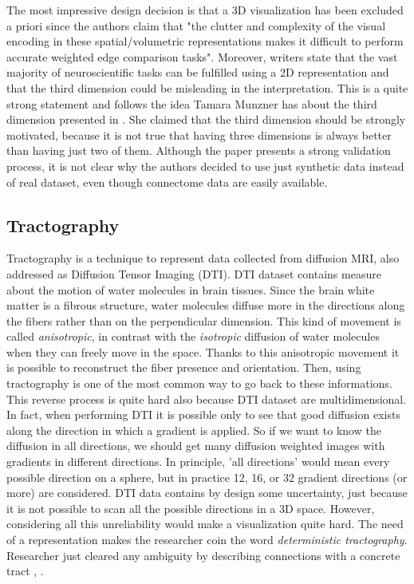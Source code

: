 \documentclass{article}
\begin{document}
\begin{multicols}{2}
The most impressive design decision is that a 3D visualization has been excluded a priori since the authors claim that "the clutter and complexity of the visual encoding in these spatial/volumetric representations makes it difficult to perform accurate weighted edge comparison tasks". Moreover, writers state that the vast majority of neuroscientific tasks can be fulfilled using a 2D representation and that the third dimension could be misleading in the interpretation. This is a quite strong statement and follows the idea Tamara Munzner has about the third dimension presented in \cite{processAndPitfalls}. She claimed that the third dimension should be strongly motivated, because it is not true that having three dimensions is always better than having just two of them. Although the paper presents a strong validation process, it is not clear why the authors decided to use just synthetic data instead of real dataset, even though connectome data are easily available.

\subsection{Tractography}
\label{subsec:tractography}
Tractography is a technique to represent data collected from diffusion MRI, also addressed as Diffusion Tensor Imaging (DTI). DTI dataset contains measure about the motion of water molecules in brain tissues. Since the brain white matter is a fibrous structure, water molecules diffuse more in the directions along the fibers rather than on the perpendicular dimension. This kind of movement is called \textit{anisotropic}, in contrast with the \textit{isotropic} diffusion of water molecules when they can freely move in the space. Thanks to this anisotropic movement it is possible to reconstruct the fiber presence and orientation. Then, using tractography is one of the most common way to go back to these informations. This reverse process is quite hard also because DTI dataset are multidimensional. In fact, when performing DTI it is possible only to see that good diffusion exists along the direction in which a gradient is applied. So if we want to know the diffusion in all directions, we should get many diffusion weighted images with gradients in different directions. In principle, 'all directions' would mean every possible direction on a sphere, but in practice 12, 16, or 32 gradient directions (or more) are considered. DTI data contains by design some uncertainty, just because it is not possible to scan all the possible directions in a 3D space. However, considering all this unreliability would make a visualization quite hard. The need of a representation makes the researcher coin the word \textit{deterministic tractography}. Researcher just cleared any ambiguity by describing connections with a concrete tract \cite{conturo1999tracking}, \cite{mori1999three}. 


\end{multicols}
\end{document}

